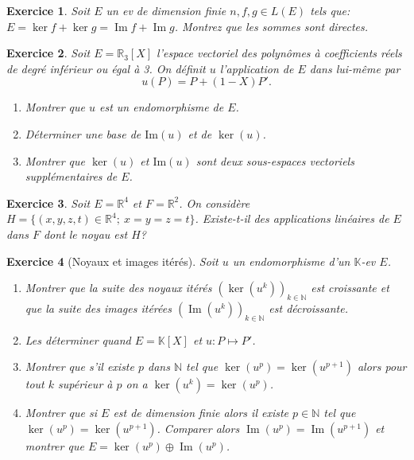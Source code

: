 \documentclass[12pt,a4paper]{article}
\newcommand{\N}{\mathbb{N}}
\newcommand{\K}{\mathbb{K} }
\DeclareMathOperator{\Ima }{Im}
\theoremstyle{break}
\theoremstyle{break}
\newtheorem{Exo}{Exercice}
\begin{document}
\begin{Exo}
	Soit $E$ un ev de dimension finie $n,f,g\in L\left( E\right) $ tels que: $E=\ker f+\ker g=\Ima  f+\Ima g$. Montrez que les sommes sont directes.
\end{Exo}
\begin{Exo}
	Soit $E=\mathbb R_3[X]$ l'espace vectoriel des polynômes à coefficients réels de degré inférieur ou égal à 3.
	On définit $u$ l'application de $E$ dans lui-même par
	$$u(P)=P+(1-X)P'.$$
	\begin{enumerate}
		\item Montrer que $u$ est un endomorphisme de $E$.
		\item Déterminer une base de $\textrm{Im}(u)$ et de $\ker(u)$.
		\item Montrer que $\ker(u)$ et $\textrm{Im}(u)$ sont deux sous-espaces
		vectoriels supplémentaires de $E$.
	\end{enumerate}
\end{Exo}

\begin{Exo}
	Soit $E=\mathbb R^4$ et $F=\mathbb R^2$. On considère
	$H=\{(x,y,z,t)\in\mathbb R^4;\ x=y=z=t\}$. Existe-t-il des applications linéaires de $E$ dans $F$ dont le noyau est $H$?
\end{Exo}

\begin{Exo}[Noyaux et images itérés]
	Soit $u$ un endomorphisme d'un $\K$-ev $E$.
	\begin{enumerate}
		\item
		Montrer que la suite des noyaux itérés $\left(\ker(u^k)\right)_{k\in\N}$ est croissante et que la suite des images itérées $\left(\Ima(u^k)\right)_{k\in\N}$ est décroissante.
		\item
		Les déterminer quand $E=\K[X]$ et $u:P\mapsto P'$.
		\item
		Montrer que s'il existe $p$ dans $\N$ tel que $\ker(u^p)=\ker(u^{p+1})$ alors pour tout $k$ supérieur à $p$ on a $\ker(u^k)=\ker(u^p)$.
		\item
		Montrer que si $E$ est de dimension finie alors il existe $p\in\N$ tel que $\ker(u^p)=\ker(u^{p+1})$. Comparer alors $\Ima(u^p)=\Ima(u^{p+1})$ et montrer que $E=\ker(u^p)\oplus \Ima(u^p)$.
	\end{enumerate}
\end{Exo}
\end{document}
